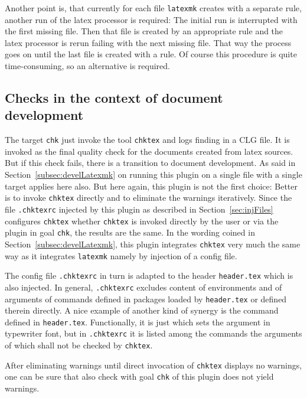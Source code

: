 Another point is, that currently for each file \texttt{latexmk} creates with a separate rule, 
another run of the latex processor is required: 
The initial run is interrupted with the first missing file. 
Then that file is created by an appropriate rule and the latex processor is rerun 
failing with the next missing file. 
That way the process goes on until the last file is created with a rule. 
Of course this procedure is quite time-consuming, so an alternative is required. 



\subsection{Checks in the context of document development}\label{subsec:develCheck}

The target \texttt{chk} just invoke the tool \texttt{chktex} and logs finding in a CLG file. 
It is invoked as the final quality check for the documents created from latex sources. 
But if this check fails, there is a transition to document development. 
As said in Section~\ref{subsec:develLatexmk} on running this plugin on a single file with a single target 
applies here also. 
But here again, this plugin is not the first choice: Better is to invoke \texttt{chktex} directly 
and to eliminate the warnings iteratively. 
Since the file \texttt{.chktexrc} injected by this plugin as described in Section~\ref{sec:injFiles} 
configures \texttt{chktex} whether \texttt{chktex} is invoked directly by the user 
or via the plugin in goal \texttt{chk}, the results are the same. 
In the wording coined in Section~\ref{subsec:develLatexmk}, 
this plugin integrates \texttt{chktex} very much the same way as it integrates \texttt{latexmk} 
namely by injection of a config file. 

The config file \texttt{.chktexrc} in turn is adapted to the header \texttt{header.tex} 
which is also injected. 
In general, \texttt{.chktexrc} excludes content of environments 
and of arguments of commands defined in packages loaded by \texttt{header.tex} 
or defined therein directly. 
A nice example of another kind of synergy is the command  
defined in \texttt{header.tex}. 
Functionally, it is just  which sets the argument in typewriter font, 
but in \texttt{.chktexrc} it is listed among the commands 
the arguments of which shall not be checked by \texttt{chktex}. 
\medskip


After eliminating warnings until direct invocation of \texttt{chktex} displays no warnings, 
one can be sure that also check with goal \texttt{chk} of this plugin does not yield warnings. 


